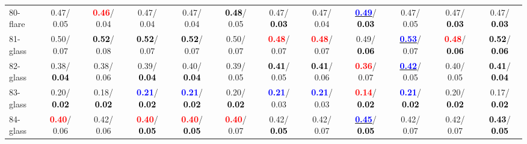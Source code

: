 \begin{table}[h]
\begin{center}
{\begin{tabular}{lc|c|c|c|c|c|c|c|c|c|c}
80-flare &   0.47/  0.05 & \textcolor{red}{\textbf{  0.46}}/  0.04 &   0.47/  0.04 &   0.47/  0.04 & \textcolor{black}{\textbf{  0.48}}/  0.05 &   0.47/\textcolor{black}{\textbf{  0.03}} &   0.47/  0.04 & \underline{\textcolor{blue}{\textbf{  0.49}}}/\textcolor{black}{\textbf{  0.03}} &   0.47/  0.05 &   0.47/\textcolor{black}{\textbf{  0.03}} &   0.47/\textcolor{black}{\textbf{  0.03}} \\
81-glass &   0.50/  0.07 & \textcolor{black}{\textbf{  0.52}}/  0.08 & \textcolor{black}{\textbf{  0.52}}/  0.07 & \textcolor{black}{\textbf{  0.52}}/  0.07 &   0.50/  0.07 & \textcolor{red}{\textbf{  0.48}}/  0.07 & \textcolor{red}{\textbf{  0.48}}/  0.07 &   0.49/\textcolor{black}{\textbf{  0.06}} & \underline{\textcolor{blue}{\textbf{  0.53}}}/  0.07 & \textcolor{red}{\textbf{  0.48}}/\textcolor{black}{\textbf{  0.06}} & \textcolor{black}{\textbf{  0.52}}/\textcolor{black}{\textbf{  0.06}} \\
82-glass &   0.38/\textcolor{black}{\textbf{  0.04}} &   0.38/  0.06 &   0.39/\textcolor{black}{\textbf{  0.04}} &   0.40/\textcolor{black}{\textbf{  0.04}} &   0.39/  0.05 & \textcolor{black}{\textbf{  0.41}}/  0.05 & \textcolor{black}{\textbf{  0.41}}/  0.06 & \textcolor{red}{\textbf{  0.36}}/  0.07 & \underline{\textcolor{blue}{\textbf{  0.42}}}/  0.05 &   0.40/  0.05 & \textcolor{black}{\textbf{  0.41}}/\textcolor{black}{\textbf{  0.04}} \\
83-glass &   0.20/\textcolor{black}{\textbf{  0.02}} &   0.18/\textcolor{black}{\textbf{  0.02}} & \textcolor{blue}{\textbf{  0.21}}/\textcolor{black}{\textbf{  0.02}} & \textcolor{blue}{\textbf{  0.21}}/\textcolor{black}{\textbf{  0.02}} &   0.20/\textcolor{black}{\textbf{  0.02}} & \textcolor{blue}{\textbf{  0.21}}/  0.03 & \textcolor{blue}{\textbf{  0.21}}/  0.03 & \textcolor{red}{\textbf{  0.14}}/\textcolor{black}{\textbf{  0.02}} & \textcolor{blue}{\textbf{  0.21}}/\textcolor{black}{\textbf{  0.02}} &   0.20/\textcolor{black}{\textbf{  0.02}} &   0.17/\textcolor{black}{\textbf{  0.02}} \\
84-glass & \textcolor{red}{\textbf{  0.40}}/  0.06 &   0.42/  0.06 & \textcolor{red}{\textbf{  0.40}}/\textcolor{black}{\textbf{  0.05}} & \textcolor{red}{\textbf{  0.40}}/\textcolor{black}{\textbf{  0.05}} & \textcolor{red}{\textbf{  0.40}}/  0.07 &   0.42/\textcolor{black}{\textbf{  0.05}} &   0.42/  0.07 & \underline{\textcolor{blue}{\textbf{  0.45}}}/\textcolor{black}{\textbf{  0.05}} &   0.42/  0.07 &   0.42/  0.07 & \textcolor{black}{\textbf{  0.43}}/\textcolor{black}{\textbf{  0.05}} \\

\end{tabular}}
\end{center}
\end{table}
